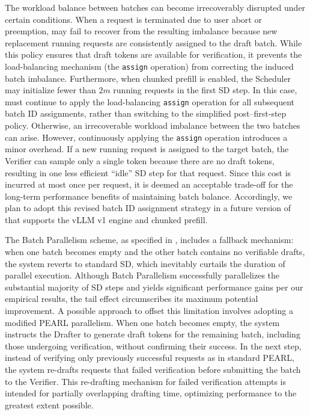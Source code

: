 

The workload balance between batches can become irrecoverably disrupted under certain conditions. When a request is terminated due to user abort or preemption, \alg{} may fail to recover from the resulting imbalance because new replacement running requests are consistently assigned to the draft batch. While this policy ensures that draft tokens are available for verification, it prevents the load-balancing mechanism (the \texttt{assign} operation) from correcting the induced batch imbalance.
Furthermore, when chunked prefill is enabled, the Scheduler may initialize fewer than $2m$ running requests in the first SD step. In this case, \alg{} must continue to apply the load-balancing \texttt{assign} operation for all subsequent batch ID assignments, rather than switching to the simplified post–first-step policy. Otherwise, an irrecoverable workload imbalance between the two batches can arise.
However, continuously applying the \texttt{assign} operation introduces a minor overhead. If a new running request is assigned to the target batch, the Verifier can sample only a single token because there are no draft tokens, resulting in one less efficient “idle” SD step for that request. Since this cost is incurred at most once per request, it is deemed an acceptable trade-off for the long-term performance benefits of maintaining batch balance. Accordingly, we plan to adopt this revised batch ID assignment strategy in a future version of \alg{} that supports the vLLM v1 engine and chunked prefill.


The Batch Parallelism scheme, as specified in , includes a fallback mechanism: when one batch becomes empty and the other batch contains no verifiable drafts, the system reverts to standard SD, which inevitably curtails the duration of parallel execution. Although Batch Parallelism successfully parallelizes the substantial majority of SD steps and yields significant performance gains per our empirical results, the tail effect circumscribes its maximum potential improvement.
A possible approach to offset this limitation involves adopting a modified PEARL parallelism. When one batch becomes empty, the system instructs the Drafter to generate draft tokens for the remaining batch, including those undergoing verification, without confirming their success. In the next step, instead of verifying only previously successful requests as in standard PEARL, the system re-drafts requests that failed verification before submitting the batch to the Verifier. This re-drafting mechanism for failed verification attempts is intended for partially overlapping drafting time, optimizing performance to the greatest extent possible.
